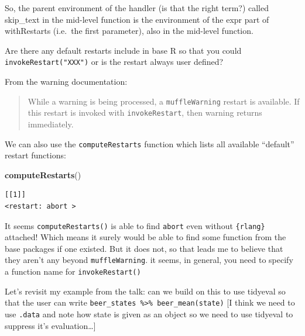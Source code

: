 \documentclass[]{book}
\newenvironment{Shaded}{\begin{snugshade}}{\end{snugshade}}
\newcommand{\KeywordTok}[1]{\textcolor[rgb]{0.13,0.29,0.53}{\textbf{#1}}}
\newcommand{\NormalTok}[1]{#1}
\begin{document}
So, the parent environment of the handler (is that the right term?) called skip\_text in the mid-level function is the environment of the expr part of withRestarts (i.e.~the first parameter), also in the mid-level function.

Are there any default restarts include in base R so that you could \texttt{invokeRestart("XXX")} or is the restart always user defined?

From the warning documentation:

\begin{quote}
While a warning is being processed, a \texttt{muffleWarning} restart is available. If this restart is invoked with \texttt{invokeRestart}, then warning returns immediately.
\end{quote}

We can also use the \texttt{computeRestarts} function which lists all available ``default'' restart functions:

\begin{Shaded}
\begin{Highlighting}[]
\KeywordTok{computeRestarts}\NormalTok{()}
\end{Highlighting}
\end{Shaded}

\begin{verbatim}
[[1]]
<restart: abort >
\end{verbatim}

It seems \texttt{computeRestarts()} is able to find \texttt{abort} even without \texttt{\{rlang\}} attached! Which means it surely would be able to find some function from the base packages if one existed. But it does not, so that leads me to believe that they aren't any beyond \texttt{muffleWarning}. it seems, in general, you need to specify a function name for \texttt{invokeRestart()}

Let's revisit my example from the talk: can we build on this to use tidyeval so that the user can write \texttt{beer\_states\ \%\textgreater{}\%\ beer\_mean(state)} {[}I think we need to use \texttt{.data} and note how state is given as an object so we need to use tidyeval to suppress it's evaluation\ldots{}{]}
\end{document}
